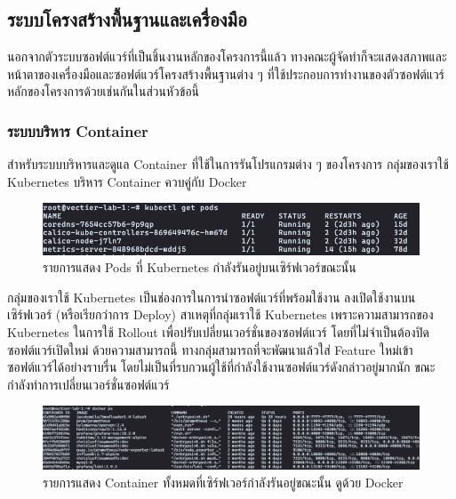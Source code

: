 \documentclass[12pt,one side,openright,a4paper]{cpe-thesis-th}
\newcommand{\thaijustify}[1]{%
  \par\hspace{30pt}\justifying
  #1
}
\begin{document}
        \pagebreak
    \subsection{ระบบโครงสร้างพื้นฐานและเครื่องมือ}
        นอกจากตัวระบบซอฟต์แวร์ที่เป็นชิ้นงานหลักของโครงการนี้แล้ว ทางคณะผู้จัดทำก็จะแสดงสภาพและหน้าตาของเครื่องมือและซอฟต์แวร์โครงสร้างพื้นฐานต่าง ๆ ที่ใช้ประกอบการทำงานของตัวซอฟต์แวร์หลักของโครงการด้วยเช่นกันในส่วนหัวข้อนี้
        \subsubsection{ระบบบริหาร Container}
            \thaijustify{
                สำหรับระบบบริหารและดูแล Container ที่ใช้ในการรันโปรแกรมต่าง ๆ ของโครงการ กลุ่มของเราใช้ Kubernetes บริหาร Container ควบคู่กับ Docker
            }
            \begin{figure}[H]
                \centering
                \includegraphics[width=15cm]{figure/results/kubectl.png}
                \caption[รายการ Pods ของ Kubernetes]{รายการแสดง Pods ที่ Kubernetes กำลังรันอยู่บนเซิร์ฟเวอร์ขณะนั้น}
                \label{fig:res-kube}
            \end{figure}
            \thaijustify{
                กลุ่มของเราใช้ Kubernetes เป็นช่องการในการนำซอฟต์แวร์ที่พร้อมใช้งาน ลงเปิดใช้งานบนเซิร์ฟเวอร์ (หรือเรียกว่าการ Deploy) สาเหตุที่กลุ่มเราใช้ Kubernetes เพราะความสามารถของ Kubernetes ในการใช้ Rollout เพื่อปรับเปลี่ยนเวอร์ชั่นของซอฟต์แวร์ โดยที่ไม่จำเป็นต้องปิดซอฟต์แวร์เปิดใหม่ ด้วยความสามารถนี้ ทางกลุ่มสามารถที่จะพัฒนาแล้วใส่ Feature ใหม่เข้าซอฟต์แวร์ได้อย่างราบรื่น โดยไม่เป็นที่รบกวนผู้ใช้ที่กำลังใช้งานซอฟต์แวร์ดังกล่าวอยู่มากนัก ขณะกำลังทำการเปลี่ยนเวอร์ชั่นซอฟต์แวร์
            }
            \begin{figure}[H]
                \centering
                \includegraphics[width=15cm]{figure/results/dockerps.png}
                \caption[รายการ Container แสดงด้วย Docker]{รายการแสดง Container ทั้งหมดที่เซิร์ฟเวอร์กำลังรันอยู่ขณะนั้น ดูด้วย Docker}
                \label{fig:res-docker}
            \end{figure}
\end{document}
